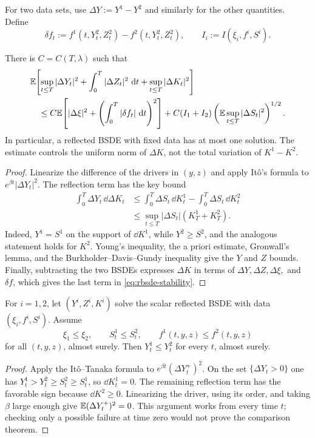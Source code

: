 For two data sets, use $\Delta Y:=Y^1-Y^2$ and similarly for the other
quantities. Define
\[
  \delta f_t
  :=f^1(t,Y_t^2,Z_t^2)-f^2(t,Y_t^2,Z_t^2),
  \qquad
  I_i:=I(\xi_i,f^i,S^i).
\]

\begin{theorem}[Stability]
There is $C=C(T,\lambda)$ such that
\begin{align}
  &\mathbb E\!\left[
    \sup_{t\leq T}|\Delta Y_t|^2
    +\int_0^T|\Delta Z_t|^2\,\mathop{}\!\mathrm d t
    +\sup_{t\leq T}|\Delta K_t|^2
  \right] \notag\\
  &\quad\leq
  C\mathbb E\!\left[
    |\Delta\xi|^2
    +\left(\int_0^T|\delta f_t|\,\mathop{}\!\mathrm d t\right)^2
  \right]
  +C(I_1+I_2)
    \left(\mathbb E\sup_{t\leq T}|\Delta S_t|^2\right)^{1/2}.
  \label{eq:rbsde-stability}
\end{align}
In particular, a reflected BSDE with fixed data has at most one solution.
The estimate controls the uniform norm of $\Delta K$, not the total variation
of $K^1-K^2$.
\end{theorem}

\begin{proof}
Linearize the difference of the drivers in $(y,z)$ and apply It\^o's formula
to $e^{\beta t}|\Delta Y_t|^2$. The reflection term has the key bound
\begin{align*}
  \int_0^T\Delta Y_t\,\dd\Delta K_t
  &\leq \int_0^T\Delta S_t\,\dd K_t^1
       -\int_0^T\Delta S_t\,\dd K_t^2\\
  &\leq\sup_{t\leq T}|\Delta S_t|(K_T^1+K_T^2).
\end{align*}
Indeed, $Y^1=S^1$ on the support of $\dd K^1$, while
$Y^2\geq S^2$, and the analogous statement holds for $K^2$.
Young's inequality, the a priori estimate, Gronwall's lemma, and the
Burkholder--Davis--Gundy inequality give the $Y$ and $Z$ bounds. Finally,
subtracting the two BSDEs expresses $\Delta K$ in terms of
$\Delta Y,\Delta Z,\Delta\xi,$ and $\delta f$, which gives the last term in
\eqref{eq:rbsde-stability}.
\end{proof}

\begin{theorem}[Comparison]
For $i=1,2$, let $(Y^i,Z^i,K^i)$ solve the scalar reflected BSDE with data
$(\xi_i,f^i,S^i)$. Assume
\[
  \xi_1\leq\xi_2,
  \qquad S^1_t\leq S^2_t,
  \qquad f^1(t,y,z)\leq f^2(t,y,z)
\]
for all $(t,y,z)$, almost surely. Then $Y_t^1\leq Y_t^2$ for every $t$,
almost surely.
\end{theorem}

\begin{proof}
Apply the It\^o--Tanaka formula to $e^{\beta t}(\Delta Y_t^+)^2$. On the set
$\{\Delta Y_t>0\}$ one has
$Y_t^1>Y_t^2\geq S_t^2\geq S_t^1$, so $\dd K_t^1=0$. The remaining reflection
term has the favorable sign because $\dd K^2\geq0$. Linearizing the driver,
using its order, and taking $\beta$ large enough give
$\mathbb E(\Delta Y_t^+)^2=0$. This argument works from every time $t$; checking
only a possible failure at time zero would not prove the comparison theorem.
\end{proof}

